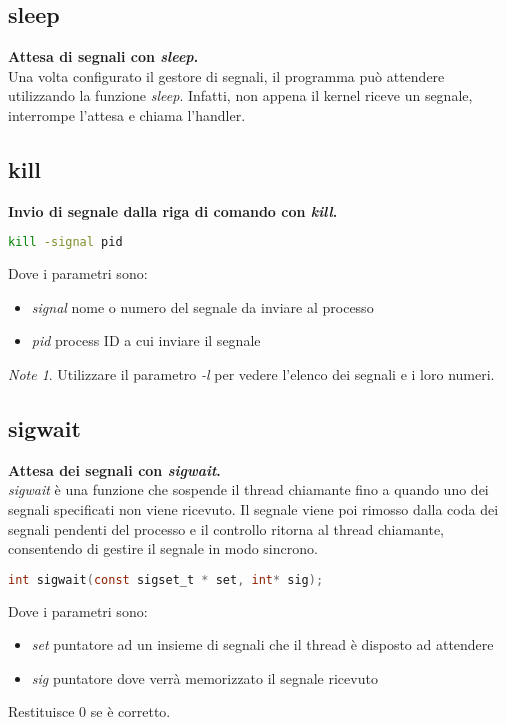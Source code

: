 \documentclass[a4paper,10pt]{article}
\theoremstyle{remark}
\newtheorem{note}{Note}[subsubsection]
\theoremstyle{definition}
\theoremstyle{plain}
\theoremstyle{definition}
\theoremstyle{definition}
\theoremstyle{definition}
\theoremstyle{plain}
\theoremstyle{plain}
\begin{document}
\subsection{sleep}
\textbf{Attesa di segnali con \textit{sleep}.}\\
Una volta configurato il gestore di segnali, il programma può attendere utilizzando la funzione \textit{sleep}. Infatti, non appena il kernel riceve un segnale, interrompe l'attesa e chiama l'handler.
\subsection{kill}
\textbf{Invio di segnale dalla riga di comando con \textit{kill}.}\\
\begin{lstlisting}[language=BASH]
	kill -signal pid
\end{lstlisting}
Dove i parametri sono:
\begin{itemize}
	\item \textit{signal} nome o numero del segnale da inviare al processo
	\item \textit{pid} process ID a cui inviare il segnale
\end{itemize}

\begin{note}
	Utilizzare il parametro \textit{-l} per vedere l'elenco dei segnali e i loro numeri.
\end{note}

\subsection{sigwait}
\textbf{Attesa dei segnali con \textit{sigwait}.}\\
\textit{sigwait} è una funzione che sospende il thread chiamante fino a quando uno dei segnali specificati non viene ricevuto. Il segnale viene poi rimosso dalla coda dei segnali pendenti del processo e il controllo ritorna al thread chiamante, consentendo di gestire il segnale in modo sincrono.
\begin{lstlisting}[language=C]
	int sigwait(const sigset_t * set, int* sig);
\end{lstlisting}
Dove i parametri sono:
\begin{itemize}
	\item \textit{set} puntatore ad un insieme di segnali che il thread è disposto ad attendere
	\item \textit{sig} puntatore dove verrà memorizzato il segnale ricevuto
\end{itemize}
Restituisce $0$ se è corretto.
\end{document}
